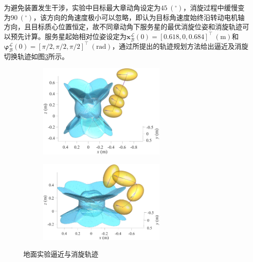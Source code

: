 \documentclass[lang=chs, degree=master, blindreview=false, winfonts=true]{yanputhesis}
\begin{document}
为避免装置发生干涉，实验中目标最大章动角设定为$45\ (\mathrm{^\circ})$，消旋过程中缓慢变为$90\ (\mathrm{^\circ})$，该方向的角速度极小可以忽略，即认为目标角速度始终沿转动电机轴方向，且目标质心位置恒定，故不同章动角下服务星的最优消旋位姿和消旋轨迹可以预先计算。服务星起始相对位姿设定为${{\boldsymbol{x}}_\mathcal{B}^{\mathcal{L}}}(0)=[0.618,0,0.684]^{\top}\ (\mathrm{m})$和${{\boldsymbol{\varphi}}_\mathcal{B}^{\mathcal{L}}}(0)=[\pi/2,\pi/2,\pi/2]^{\top}\ (\mathrm{rad})$，通过所提出的轨迹规划方法给出逼近及消旋切换轨迹如图\ref{Fig.exp_tra}所示。
\begin{figure}[htbp]
	\centering
	\begin{minipage}[t]{0.96\textwidth}
		\begin{subfigure}[t]{0.47\textwidth}
			\centering
			\includegraphics[width = 2.5in]{picture/exp_proximity_tra.eps}
			\caption{ }
			\label{fig:exp_proximity_tra}
		\end{subfigure}
		\begin{subfigure}[t]{0.47\textwidth}
			\centering
			\includegraphics[width = 2.5in]{picture/exp_detumble_tra.eps}
			\caption{ }
			\label{fig:exp_detumble_tra}
		\end{subfigure}
	\end{minipage}
	\caption{地面实验逼近与消旋轨迹\label{Fig.exp_tra}}
\end{figure}
\end{document}
